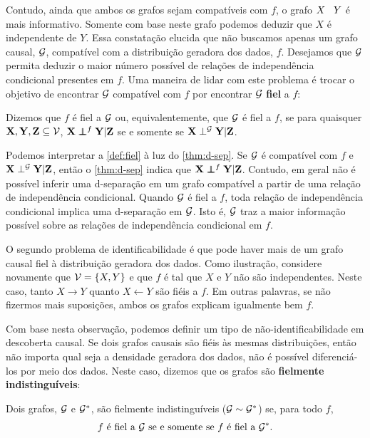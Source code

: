 Contudo, ainda que 
ambos os grafos sejam compatíveis com $f$,
o grafo $X \hspace{3 mm} Y$ é mais informativo.
Somente com base neste grafo podemos
deduzir que $X$ é independente de $Y$.
Essa constatação elucida que não buscamos apenas
um grafo causal, ${\mathcal G}$, compatível com 
a distribuição geradora dos dados, $f$.
Desejamos que ${\mathcal G}$ permita
deduzir o maior número possível 
de relações de independência condicional presentes em $f$.
Uma maneira de lidar com este problema é 
trocar o objetivo de encontrar 
${\mathcal G}$ compatível com $f$ por
encontrar ${\mathcal G}$ \textbf{fiel} a $f$:

\begin{definition}
 \label{def:fiel}
 Dizemos que $f$ é fiel a ${\mathcal G}$ ou, equivalentemente,
 que ${\mathcal G}$ é fiel a $f$, se
 para quaisquer ${\mathbf{X}}, {\mathbf{Y}}, {\mathbf{Z}} \subseteq {\mathcal V}$,
 ${\mathbf{X}} \perp\!\!\!\!\perp^f {\mathbf{Y}} | {\mathbf{Z}}$ se e somente se
 ${\mathbf{X}} \perp^{\mathcal G} {\mathbf{Y}} | {\mathbf{Z}}$.
\end{definition}

Podemos interpretar a \cref{def:fiel} 
à luz do \cref{thm:d-sep}.
Se ${\mathcal G}$ é compatível com $f$ e
${\mathbf{X}} \perp^{\mathcal G} {\mathbf{Y}} | {\mathbf{Z}}$, então
o \cref{thm:d-sep} indica que
${\mathbf{X}} \perp\!\!\!\!\perp^f {\mathbf{Y}} | {\mathbf{Z}}$.
Contudo, em geral não é possível inferir
uma d-separação em um grafo compatível
a partir de uma relação de independência condicional.
Quando ${\mathcal G}$ é fiel a $f$,
toda relação de independência condicional implica
uma d-separação em ${\mathcal G}$. Isto é,
${\mathcal G}$ traz a maior informação possível sobre
as relações de independência condicional em $f$.

O segundo problema de identificabilidade é que
pode haver mais de um grafo causal fiel
à distribuição geradora dos dados.
Como ilustração, considere novamente que
${\mathcal V} = \{X, Y\}$ e que $f$ é tal que
$X$ e $Y$ não são independentes.
Neste caso, tanto
$X \rightarrow Y$
quanto $X \leftarrow Y$ são fiéis a $f$.
Em outras palavras, 
se não fizermos mais suposições,
ambos os grafos explicam igualmente bem $f$.

Com base nesta observação,
podemos definir um tipo de
não-identificabilidade em
descoberta causal.
Se dois grafos causais são fiéis às
mesmas distribuições, então
não importa qual seja a densidade geradora dos dados,
não é possível diferenciá-los por meio dos dados.
Neste caso, dizemos que os grafos são
\textbf{fielmente indistinguíveis}:

\begin{definition}
 \label{def:fiel_equiv}
 Dois grafos, ${\mathcal G}$ e ${\mathcal G}^*$, são
 fielmente indistinguíveis
 (${\mathcal G} \sim {\mathcal G}^*$) se,
 para todo $f$,
 \begin{align*}
  \text{$f$ é fiel a ${\mathcal G}$
  se e somente se
  $f$ é fiel a ${\mathcal G}^*$}.
 \end{align*}
\end{definition}

